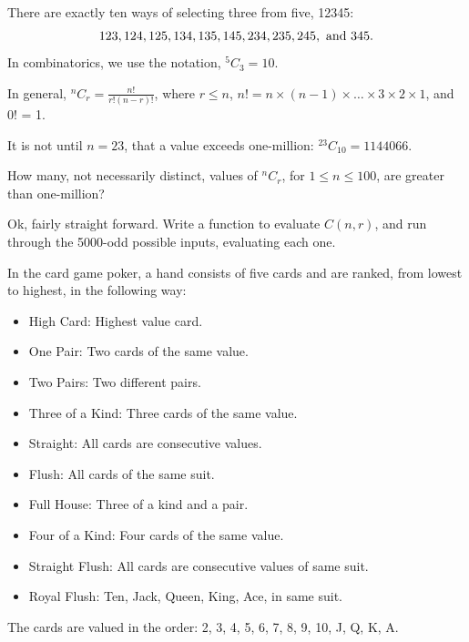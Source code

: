 


There are exactly ten ways of selecting three from five, 12345:
$$ 123, 124, 125, 134, 135, 145, 234, 235, 245, \hbox{ and } 345.$$
In combinatorics, we use the notation, $^5C_3 = 10$.

In general, $^nC_r = \frac{n!}{r!(n-r)!}$, where
$r \leq n$, $n! = n\times(n-1)\times\dots\times3\times2\times1$, and 0! = 1.

It is not until $n = 23$, that a value exceeds one-million: $^{23}C_{10} = 1144066$.

How many, not necessarily distinct, values of  $^nC_r$, for $1 \leq n \leq 100$, are greater than one-million?

Ok, fairly straight forward.  Write a function to evaluate $C(n,r)$, and run through the 5000-odd possible inputs,
evaluating each one.




In the card game poker, a hand consists of five cards and are ranked, from lowest to highest, in the following way:
\begin{itemize}
\vspace{-0.25cm}    \item High Card: Highest value card.
\vspace{-0.25cm}    \item One Pair: Two cards of the same value.
\vspace{-0.25cm}    \item Two Pairs: Two different pairs.
\vspace{-0.25cm}    \item Three of a Kind: Three cards of the same value.
\vspace{-0.25cm}    \item Straight: All cards are consecutive values.
\vspace{-0.25cm}    \item Flush: All cards of the same suit.
\vspace{-0.25cm}    \item Full House: Three of a kind and a pair.
\vspace{-0.25cm}    \item Four of a Kind: Four cards of the same value.
\vspace{-0.25cm}    \item Straight Flush: All cards are consecutive values of same suit.
\vspace{-0.25cm}    \item Royal Flush: Ten, Jack, Queen, King, Ace, in same suit.
\end{itemize}
\vspace{-0.25cm}
The cards are valued in the order:
2, 3, 4, 5, 6, 7, 8, 9, 10, J, Q, K, A.

